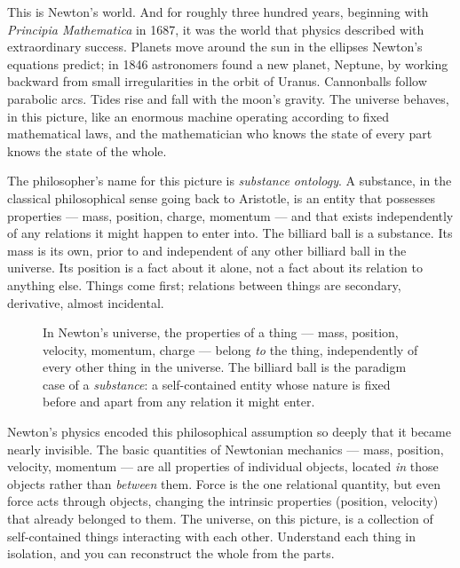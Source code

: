 This is Newton's world. And for roughly three hundred years, beginning with \textit{Principia Mathematica} in 1687, it was the world that physics described with extraordinary success. Planets move around the sun in the ellipses Newton's equations predict; in 1846 astronomers found a new planet, Neptune, by working backward from small irregularities in the orbit of Uranus. Cannonballs follow parabolic arcs. Tides rise and fall with the moon's gravity. The universe behaves, in this picture, like an enormous machine operating according to fixed mathematical laws, and the mathematician who knows the state of every part knows the state of the whole.

The philosopher's name for this picture is \emph{substance ontology}. A substance, in the classical philosophical sense going back to Aristotle, is an entity that possesses properties --- mass, position, charge, momentum --- and that exists independently of any relations it might happen to enter into. The billiard ball is a substance. Its mass is its own, prior to and independent of any other billiard ball in the universe. Its position is a fact about it alone, not a fact about its relation to anything else. Things come first; relations between things are secondary, derivative, almost incidental.

\begin{figure}[htbp]
  \centering
  \resizebox{0.70\linewidth}{!}{}
  \caption[Newton's ball: intrinsic properties]{In Newton's universe, the properties of a thing --- mass, position, velocity, momentum, charge --- belong \emph{to} the thing, independently of every other thing in the universe. The billiard ball is the paradigm case of a \emph{substance}: a self-contained entity whose nature is fixed before and apart from any relation it might enter.}
  \label{fig:billiard-intrinsic}
\end{figure}

Newton's physics encoded this philosophical assumption so deeply that it became nearly invisible. The basic quantities of Newtonian mechanics --- mass, position, velocity, momentum --- are all properties of individual objects, located \emph{in} those objects rather than \emph{between} them. Force is the one relational quantity, but even force acts through objects, changing the intrinsic properties (position, velocity) that already belonged to them. The universe, on this picture, is a collection of self-contained things interacting with each other. Understand each thing in isolation, and you can reconstruct the whole from the parts.

